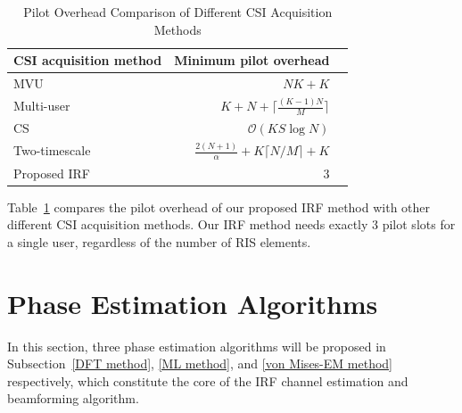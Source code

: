 \documentclass[conference,10pt,twocolumn]{IEEEtran}
\theoremstyle{nonumberplain}
\begin{document}
    \begin{table}[t]
        \caption{Pilot Overhead Comparison of Different CSI Acquisition Methods}
        \label{tab:pilot overhead comp CE}
        \centering
        \begin{tabular}{|l|r|r|}
                \hline 
                CSI acquisition method & Minimum pilot overhead\\ 
                \hline
                MVU\cite{jensen2020optimal}         & $NK+K$     \\
                \hline
                Multi-user\cite{wang2020channel}  & $K+N+ \lceil \frac{(K-1)N}{M} \rceil$\\
                \hline
                CS\cite{wei2021channel}          & $\mathcal{O}(KS\log N)$ \\
                \hline 
                Two-timescale\cite{Huchen} & $\frac{2(N+1)}{\alpha} + K\lceil N/M\rceil +K$  \\
                \hline 
                Proposed IRF & 3 \\ 
                \hline
        \end{tabular}
    \end{table}

    Table~\ref{tab:pilot overhead comp CE} compares the pilot overhead of our proposed IRF method with other different CSI acquisition methods. Our IRF method needs exactly 3 pilot slots for a single user, regardless of the number of RIS elements. 

\section{Phase Estimation Algorithms}
In this section, three phase estimation algorithms will be proposed in Subsection~\ref{DFT method}, \ref{ML method}, and \ref{von Mises-EM method} respectively, which constitute the core of the \ac{IRF} channel estimation and beamforming algorithm.
\end{document}

